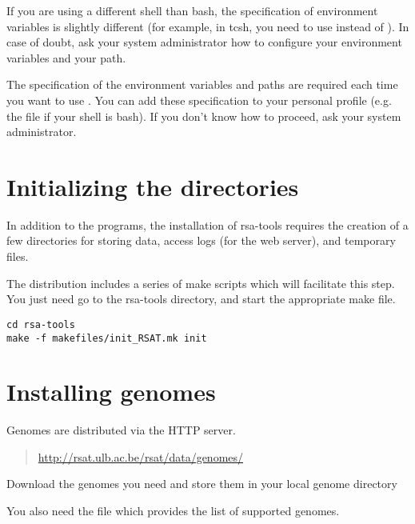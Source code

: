 \documentclass{article}
\begin{document}
If you are using a different shell than bash, the specification of
environment variables is slightly different (for example, in tcsh, you
need to use  instead of ). In case of
doubt, ask your system administrator how to configure your environment
variables and your path.

The specification of the environment variables and paths are required
each time you want to use \RSAT. You can add these specification to
your personal profile (e.g. the  file if your shell is
bash). If you don't know how to proceed, ask your system
administrator.



\section{Initializing the directories}

In addition to the programs, the installation of rsa-tools requires
the creation of a few directories for storing data, access logs (for
the web server), and temporary files.  

The distribution includes a series of make scripts which will
facilitate this step. You just need go to the rsa-tools directory, and
start the appropriate make file.

\begin{verbatim}
cd rsa-tools
make -f makefiles/init_RSAT.mk init
\end{verbatim}


\section{Installing genomes}

Genomes are distributed via the HTTP server. 

\begin{quote}
\url{http://rsat.ulb.ac.be/rsat/data/genomes/}
\end{quote}

Download the genomes you need and store them in your local \RSAT
genome directory

\begin{quote}
\end{quote}

You also need the file which provides the list of supported genomes.
\end{document}

